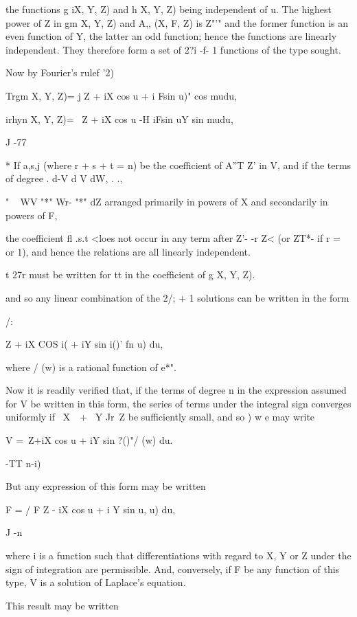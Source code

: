 the functions g iX, Y, Z) and h X, Y, Z) being independent of u. The
highest power of Z in gm X, Y, Z) and A,, (X, F, Z) is Z"'" and the
former function is an even function of Y, the latter an odd function;
hence the functions are linearly independent. They therefore form a
set of 2?i -f- 1 functions of the type sought.

Now by Fourier's rulef '2)

Trgm X, Y, Z)= j Z + iX cos u + i Fsin u)" cos mudu,

irhyn X, Y, Z)= \ Z + iX cos u -H iFsin uY sin mudu,

J -77

* If a,s,j (where r + s + t = n) be the coefficient of A''T Z' in V,
and if the terms of degree . d-V d V dW, . .,

" ~ WV "*" Wr- "*" dZ arranged primarily in powers of X and
secondarily in powers of F,

the coefficient fl .s.t <loes not occur in any term after Z'- -r Z<
(or ZT*- if r = or 1), and hence the relations are all linearly
independent.

t 27r must be written for tt in the coefficient of g X, Y, Z).

%
%

and so any linear combination of the 2/; + 1 solutions can be written
in the form

/:

 Z + iX COS i( + iY sin i()' fn u) du,

where / (w) is a rational function of e*".

Now it is readily verified that, if the terms of degree n in the
expression assumed for V be written in this form, the series of terms
under the integral sign converges uniformly if \ X\ \ + \ Y Jr\ Z be
sufficiently small, and so ) w e may write

V =\ Z+iX cos u + iY sin ?()"/ (w) du.

 -TT n-i)

But any expression of this form may be written

F = / F Z - iX cos u + i Y sin u, u) du,

J -n

where i is a function such that differentiations with regard to X, Y
or Z under the sign of integration are permissible. And, conversely,
if F be any function of this type, V is a solution of Laplace's
equation.

This result may be written

